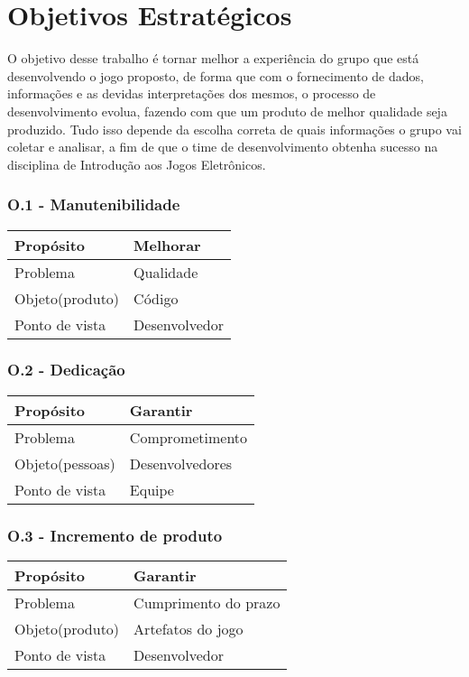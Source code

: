 \chapter{Objetivos Estratégicos}
	O objetivo desse trabalho é tornar melhor a experiência do grupo que está desenvolvendo o jogo proposto, de forma que com o fornecimento de dados, informações e as devidas interpretações dos mesmos, o processo de desenvolvimento evolua, fazendo com que um produto de melhor qualidade seja produzido. Tudo isso depende da escolha correta de quais informações o grupo vai coletar e analisar, a fim de que o time de desenvolvimento obtenha sucesso na disciplina de Introdução aos Jogos Eletrônicos.

\subsection{O.1 - Manutenibilidade}

	\begin{tabular}{ |p{5cm}|p{5cm}|  }
	 \hline
	 Propósito 		& 		Melhorar \\
	 \hline
	 Problema 		& 		Qualidade \\
	 \hline
	 Objeto(produto) 		& 		Código \\
	 \hline
	 Ponto de vista 		& 		Desenvolvedor \\
	 \hline
	\end{tabular}

\subsection{O.2 - Dedicação}

	\begin{tabular}{ |p{5cm}|p{5cm}|  }
	 \hline
	 Propósito 		& 		Garantir \\
	 \hline
	 Problema 		& 		Comprometimento \\
	 \hline
	 Objeto(pessoas) 		& 		Desenvolvedores \\
	 \hline
	 Ponto de vista 		& 		Equipe \\
	 \hline	
	\end{tabular}


\subsection{O.3 - Incremento de produto}

	\begin{tabular}{ |p{5cm}|p{5cm}|  }
	 \hline
	 Propósito 		& 		Garantir \\
	 \hline
	 Problema 		& 		Cumprimento do prazo \\
	 \hline
	 Objeto(produto) 		& 		Artefatos do jogo \\
	 \hline
	 Ponto de vista 		& 		Desenvolvedor \\
	 \hline	
	\end{tabular}


